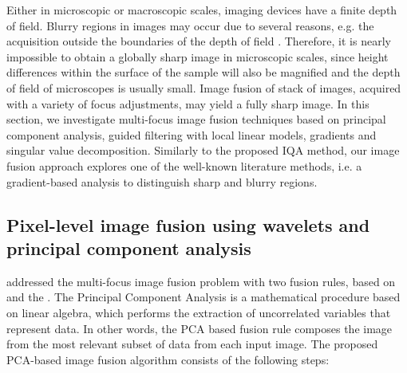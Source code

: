 Either in microscopic or macroscopic scales, imaging devices have a finite depth of field. Blurry regions in images may occur due to several reasons, e.g. the acquisition outside the boundaries of the depth of field \cite{huang2007evaluation}. Therefore, it is nearly impossible to obtain a globally sharp image in microscopic scales, since height differences within the surface of the sample will also be magnified and the depth of field of microscopes is usually small. Image fusion of stack of images, acquired with a variety of focus adjustments, may yield a fully sharp image. In this section, we investigate multi-focus image fusion techniques based on principal component analysis, guided filtering with local linear models, gradients and singular value decomposition. Similarly to the proposed IQA method, our image fusion approach explores one of the well-known literature methods, i.e. a gradient-based analysis to distinguish sharp and blurry regions.

\subsection{Pixel-level image fusion using wavelets and principal component analysis}

 addressed the multi-focus image fusion problem with two fusion rules, based on  and the . The Principal Component Analysis is a mathematical procedure based on linear algebra, which performs the extraction of uncorrelated variables that represent data. In other words, the PCA based fusion rule composes the image from the most relevant subset of data from each input image. The proposed PCA-based image fusion algorithm consists of the following steps:

